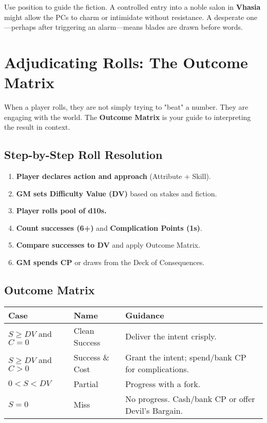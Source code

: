 Use position to guide the fiction. A controlled entry into a noble salon in \textbf{Vhasia} might allow the PCs to charm or intimidate without resistance. A desperate one—perhaps after triggering an alarm—means blades are drawn before words.

\section*{Adjudicating Rolls: The Outcome Matrix}

When a player rolls, they are not simply trying to "beat" a number. They are engaging with the world. The \textbf{Outcome Matrix} is your guide to interpreting the result in context.

\subsection*{Step-by-Step Roll Resolution}

\begin{enumerate}
    \item \textbf{Player declares action and approach} (Attribute + Skill).
    \item \textbf{GM sets Difficulty Value (DV)} based on stakes and fiction.
    \item \textbf{Player rolls pool of d10s.}
    \item \textbf{Count successes (6+)} and \textbf{Complication Points (1s)}.
    \item \textbf{Compare successes to DV} and apply Outcome Matrix.
    \item \textbf{GM spends CP} or draws from the Deck of Consequences.
\end{enumerate}

\subsection*{Outcome Matrix}

\begin{center}
\begin{tabular}{lll}
\toprule
\textbf{Case} & \textbf{Name} & \textbf{Guidance} \\
\midrule
$S \geq DV$ and $C = 0$ & Clean Success & Deliver the intent crisply. \\
$S \geq DV$ and $C > 0$ & Success \& Cost & Grant the intent; spend/bank CP for complications. \\
$0 < S < DV$ & Partial & Progress with a fork. \\
$S = 0$ & Miss & No progress. Cash/bank CP or offer Devil's Bargain. \\
\bottomrule
\end{tabular}
\end{center}

